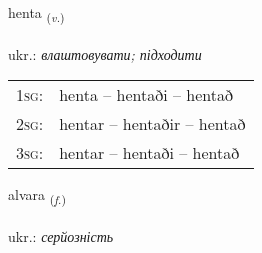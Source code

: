 \documentclass[frontgrid, backgrid]{flacards}\usepackage[]{graphicx}\usepackage[]{xcolor}
\begin{document}
\renewcommand{\flhead}{\vskip5pt \fboxsep=0pt {\small\bfseries\footnotesize Sagnorð | дієслово}}
\renewcommand{\fcfoot}{\vskip5pt \fboxsep=0pt \hspace{2pt}{\small\bfseries\footnotesize 2K}}

\renewcommand{\blhead}{\vskip5pt {\small\bfseries\footnotesize Sagnorð | дієслово }}
\renewcommand{\bcfoot}{\vskip5pt \hspace{2pt}{\small\bfseries\footnotesize 2K}}


{henta \small{\textsubscript{(\textit{v.})}} \\[1ex] %
\textphonetic{[hɛn̥ta]} \\
ukr.: \emph{влаштовувати; підходити} \\  [2ex]
\renewcommand*{\arraystretch}{0.8}
\begin{tabular}{p{1cm}l}
\textsc{1sg}: & henta -- hentaði -- hentað \\ 
\textsc{2sg}: & hentar -- hentaðir -- hentað \\ 
\textsc{3sg}: & hentar -- hentaði -- hentað \\ 
\end{tabular}
}

\renewcommand{\flhead}{\vskip5pt \fboxsep=0pt {\small\bfseries\footnotesize Nafnorð | іменник}}
\renewcommand{\fcfoot}{\vskip5pt \fboxsep=0pt \hspace{2pt}{\small\bfseries\footnotesize 2K}}

\renewcommand{\blhead}{\vskip5pt {\small\bfseries\footnotesize Nafnorð | іменник }}
\renewcommand{\bcfoot}{\vskip5pt \hspace{2pt}{\small\bfseries\footnotesize 2K}}


{alvara \small{\textsubscript{(\textit{f.})}} \\[1ex] %
\textphonetic{[alvara]} \\
ukr.: \emph{серйозність} \\  [2ex]
\renewcommand*{\arraystretch}{0.8}
}
\end{document}
